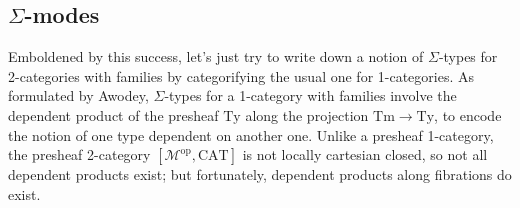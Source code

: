 \documentclass[10pt]{article}
\theoremstyle{definition}
\newcommand\op{^{\mathrm{op}}}
\newcommand\CAT{\mathrm{CAT}}
\newcommand\M{\mathcal{M}}
\begin{document}
\subsection{$\Sigma$-modes}
\label{sec:2-sigmas}

Emboldened by this success, let's just try to write down a notion of $\Sigma$-types for 2-categories with families by categorifying the usual one for 1-categories.
As formulated by Awodey, $\Sigma$-types for a 1-category with families involve the dependent product of the presheaf $\mathrm{Ty}$ along the projection $\mathrm{Tm}\to \mathrm{Ty}$, to encode the notion of one type dependent on another one.
Unlike a presheaf 1-category, the presheaf 2-category $[\M\op,\CAT]$ is not locally cartesian closed, so not all dependent products exist; but fortunately, dependent products along fibrations do exist.
\end{document}
